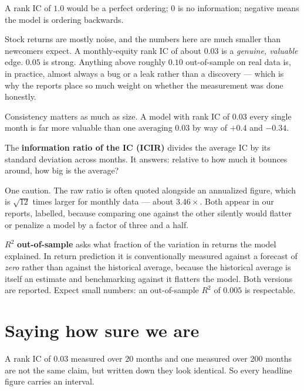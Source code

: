 \documentclass[11pt]{article}
\begin{document}
A rank IC of $1.0$ would be a perfect ordering; $0$ is no information; negative means
the model is ordering backwards.

\begin{notebox}
Stock returns are mostly noise, and the numbers here are much smaller than newcomers
expect. A monthly-equity rank IC of about $0.03$ is a \emph{genuine, valuable} edge.
$0.05$ is strong. Anything above roughly $0.10$ out-of-sample on real data is, in
practice, almost always a bug or a leak rather than a discovery --- which is why the
reports place so much weight on whether the measurement was done honestly.
\end{notebox}

Consistency matters as much as size. A model with rank IC of $0.03$ every single month
is far more valuable than one averaging $0.03$ by way of $+0.4$ and $-0.34$.

\begin{specbox}
The \textbf{information ratio of the IC (ICIR)} divides the average IC by its standard
deviation across months. It answers: relative to how much it bounces around, how big is
the average?

One caution. The raw ratio is often quoted alongside an annualized figure, which is
$\sqrt{12}$ times larger for monthly data --- about $3.46\times$. Both appear in our
reports, labelled, because comparing one against the other silently would flatter or
penalize a model by a factor of three and a half.
\end{specbox}

\begin{specbox}
$R^2$ \textbf{out-of-sample} asks what fraction of the variation in returns the model
explained. In return prediction it is conventionally measured against a forecast of
\emph{zero} rather than against the historical average, because the historical average
is itself an estimate and benchmarking against it flatters the model. Both versions
are reported. Expect small numbers: an out-of-sample $R^2$ of $0.005$ is respectable.
\end{specbox}

\section{Saying how sure we are}

A rank IC of $0.03$ measured over $20$ months and one measured over $200$ months are
not the same claim, but written down they look identical. So every headline figure
carries an interval.
\end{document}
